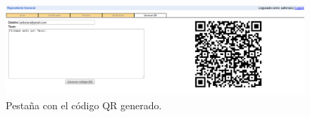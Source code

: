 \begin{figure}[h]
  \centering
    \includegraphics[scale=0.4]{./GoogleAppEngine/imagenes/codigoQR.png}
  \caption{Pestaña con el código QR generado.}
  \label{fig:codigoQR}
\end{figure}




